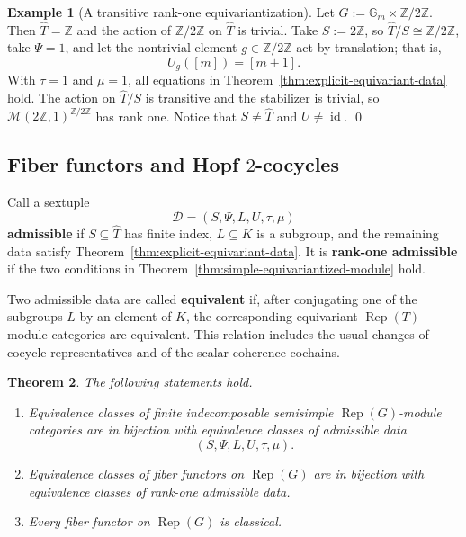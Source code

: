\documentclass{amsart}
\newtheorem{theorem}{Theorem}[section]
\theoremstyle{definition}
\newtheorem{example}[theorem]{Example}
\newcommand{\id}{\operatorname{id}}
\newcommand{\Rep}{\operatorname{Rep}}
\newcommand{\M}{\mathscr{M}}
\newcommand{\Gm}{\mathbb{G}_m}
\numberwithin{equation}{section}
\begin{document}
\begin{example}[A transitive rank-one equivariantization]\label{ex:mixed-rank-one}
Let $G:=\Gm\times \mathbb{Z}/2\mathbb{Z}$.  Then $\widehat{T}=\mathbb{Z}$ and the action of $\mathbb{Z}/2\mathbb{Z}$ on $\widehat{T}$ is
trivial.  Take $S:=2\mathbb{Z}$, so $\widehat{T}/S\cong \mathbb{Z}/2\mathbb{Z}$, take $\Psi=1$, and let the nontrivial
element $g\in \mathbb{Z}/2\mathbb{Z}$ act by translation; that is,
\[
 U_g([m])=[m+1].
\]
With $\tau=1$ and $\mu=1$, all equations in Theorem~\ref{thm:explicit-equivariant-data} hold.  The action on $\widehat{T}/S$ is transitive and the
stabilizer is trivial, so $\M(2\mathbb{Z},1)^{\mathbb{Z}/2\mathbb{Z}}$ has rank one.  Notice that
$S\neq \widehat{T}$ and $U\neq\id$. \qed
\end{example}

\subsection{\texorpdfstring{Fiber functors and Hopf $2$-cocycles}{Fiber functors and Hopf 2-cocycles}}\label{sec:fiber-functors}

Call a sextuple
\[
 \mathcal D=(S,\Psi,L,U,\tau,\mu)
\]
{\bf admissible} if $S\subseteq \widehat{T}$ has finite index, $L\subseteq K$ is a subgroup, and the remaining data
satisfy Theorem~\ref{thm:explicit-equivariant-data}.  It is {\bf rank-one
admissible} if the two conditions in Theorem~\ref{thm:simple-equivariantized-module} hold.

Two admissible data are called {\bf equivalent} if, after conjugating one of the
subgroups $L$ by an element of $K$, the corresponding equivariant
$\Rep(T)$-module categories are equivalent.  This relation includes the usual
changes of cocycle representatives and of the scalar coherence cochains.

\begin{theorem}\label{thm:module-and-fiber-classification}
The following statements hold.
\begin{enumerate}
\item Equivalence classes of finite indecomposable semisimple $\Rep(G)$-module
categories are in bijection with equivalence classes of admissible data
\[
 (S,\Psi,L,U,\tau,\mu).
\]
\item Equivalence classes of fiber functors on $\Rep(G)$ are in bijection with
equivalence classes of rank-one admissible data.
\item Every fiber functor on $\Rep(G)$ is classical.
\end{enumerate}
\end{theorem}
\end{document}
